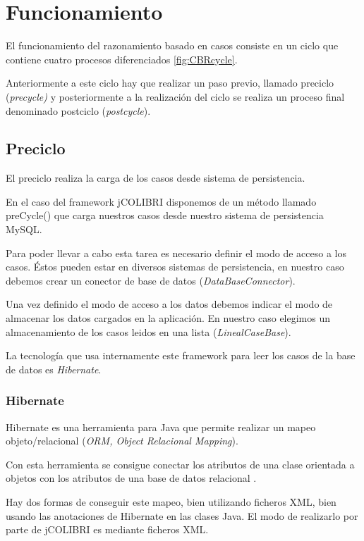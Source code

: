 \section{Funcionamiento}\label{funcionamiento}

El funcionamiento del razonamiento basado en casos consiste en un ciclo que contiene cuatro procesos diferenciados \ref{fig:CBRcycle}.

Anteriormente a este ciclo hay que realizar un paso previo, llamado preciclo (\emph{precycle)} y posteriormente a la realización del ciclo se realiza un proceso final denominado postciclo (\emph{postcycle}).

\subsection{Preciclo}\label{preciclo}

El preciclo realiza la carga de los casos desde sistema de persistencia.

En el caso del framework jCOLIBRI \cite{colibri:tut} disponemos de un método llamado preCycle() que carga nuestros casos desde nuestro sistema de persistencia MySQL.

Para poder llevar a cabo esta tarea es necesario definir el modo de acceso a los casos. Éstos pueden estar en diversos sistemas de persistencia, en nuestro caso debemos crear un conector de base de datos (\emph{DataBaseConnector}).

Una vez definido el modo de acceso a los datos debemos indicar el modo de almacenar los datos cargados en la aplicación. En nuestro caso elegimos un almacenamiento de los casos leidos en una lista (\emph{LinealCaseBase}).

La tecnología que usa internamente este framework para leer los casos de la base de datos es \emph{Hibernate}.

\subsubsection{Hibernate}\label{hibernate}

Hibernate es una herramienta para Java que permite realizar un mapeo objeto/relacional (\emph{ORM, Object Relacional Mapping}).

Con esta herramienta se consigue conectar los atributos de una clase orientada a objetos con los atributos de una base de datos relacional \cite{hibe:info}.

Hay dos formas de conseguir este mapeo, bien utilizando ficheros XML, bien usando las anotaciones de Hibernate en las clases Java. El modo de realizarlo por parte de jCOLIBRI es mediante ficheros XML.

